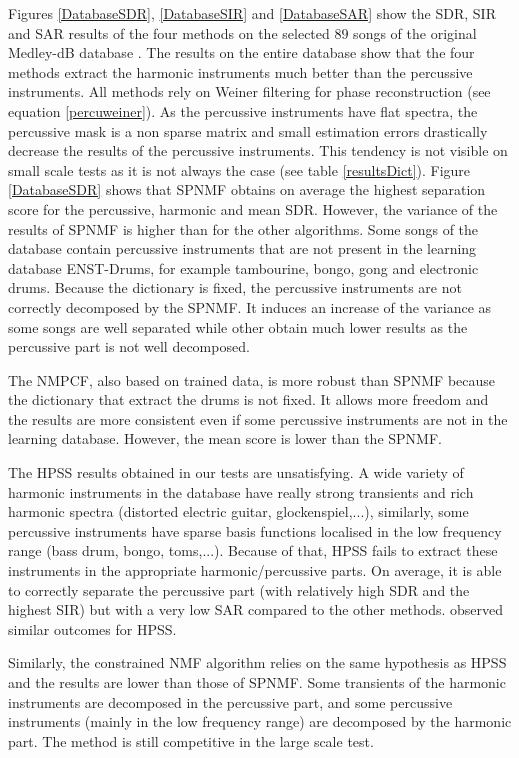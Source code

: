 \documentclass[journal]{IEEEtran}
\begin{document}
Figures \ref{DatabaseSDR}, \ref{DatabaseSIR} and \ref{DatabaseSAR} show the SDR, SIR and SAR results of the four methods on the selected $89$ songs of the original Medley-dB database \cite{bittner2014medleydb}. The results on the entire database show that the four methods extract the harmonic instruments much better than the percussive instruments. All methods rely on Weiner filtering for phase reconstruction (see equation \ref{percuweiner}). As the percussive instruments have flat spectra, the percussive mask is a non sparse matrix and small estimation errors drastically decrease the results of the percussive instruments. This tendency is not visible on small scale tests as it is not always the case (see table \ref{resultsDict}). 
Figure \ref{DatabaseSDR} shows that SPNMF obtains on average the highest separation score for the percussive, harmonic and mean SDR. However, the variance of the results of SPNMF is higher than for the other algorithms. Some songs of the database contain percussive instruments that are not present in the learning database ENST-Drums, for example tambourine, bongo, gong and electronic drums. Because the dictionary is fixed, the percussive instruments are not correctly decomposed by the SPNMF. It induces an increase of the variance as some songs are well separated while other obtain much lower results as the percussive part is not well decomposed.

The NMPCF, also based on trained data, is more robust than SPNMF because the dictionary that extract the drums is not fixed. It allows more freedom and the results are more consistent even if some percussive instruments are not in the learning database. However, the mean score is lower than the SPNMF.

The HPSS results obtained in our tests are unsatisfying. A wide variety of harmonic instruments in the database have really strong transients and rich harmonic spectra (distorted electric guitar, glockenspiel,...), similarly, some percussive instruments have sparse basis functions localised in the low frequency range (bass drum, bongo, toms,...). Because of that, HPSS fails to extract these instruments in the appropriate harmonic/percussive parts. On average, it is able to correctly separate the percussive part (with relatively high SDR and the highest SIR) but with a very low SAR compared to the other methods. \cite{canadas2014percussive} observed similar outcomes for HPSS.

Similarly, the constrained NMF algorithm relies on the same hypothesis as HPSS and the results are lower than those of SPNMF. Some transients of the harmonic instruments are decomposed in the percussive part, and some percussive instruments (mainly in the low frequency range) are decomposed by the harmonic part. The method is still competitive in the large scale test. 
\end{document}
